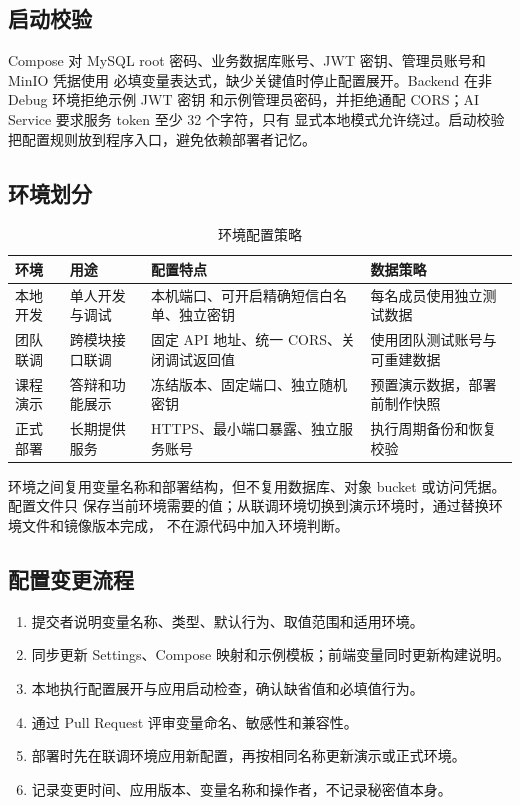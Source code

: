 \subsection{启动校验}

Compose 对 MySQL root 密码、业务数据库账号、JWT 密钥、管理员账号和 MinIO 凭据使用
必填变量表达式，缺少关键值时停止配置展开。Backend 在非 Debug 环境拒绝示例 JWT 密钥
和示例管理员密码，并拒绝通配 CORS；AI Service 要求服务 token 至少 32 个字符，只有
显式本地模式允许绕过。启动校验把配置规则放到程序入口，避免依赖部署者记忆。

\subsection{环境划分}

\begin{table}[H]
  \centering
  \caption{环境配置策略}
  \begin{tabularx}{\textwidth}{L{2.7cm}L{3.5cm}Y Y}
    \toprule
    环境 & 用途 & 配置特点 & 数据策略 \\
    \midrule
    本地开发 & 单人开发与调试 & 本机端口、可开启精确短信白名单、独立密钥 & 每名成员使用独立测试数据 \\
    团队联调 & 跨模块接口联调 & 固定 API 地址、统一 CORS、关闭调试返回值 & 使用团队测试账号与可重建数据 \\
    课程演示 & 答辩和功能展示 & 冻结版本、固定端口、独立随机密钥 & 预置演示数据，部署前制作快照 \\
    正式部署 & 长期提供服务 & HTTPS、最小端口暴露、独立服务账号 & 执行周期备份和恢复校验 \\
    \bottomrule
  \end{tabularx}
\end{table}

环境之间复用变量名称和部署结构，但不复用数据库、对象 bucket 或访问凭据。配置文件只
保存当前环境需要的值；从联调环境切换到演示环境时，通过替换环境文件和镜像版本完成，
不在源代码中加入环境判断。

\subsection{配置变更流程}

\begin{enumerate}
  \item 提交者说明变量名称、类型、默认行为、取值范围和适用环境。
  \item 同步更新 Settings、Compose 映射和示例模板；前端变量同时更新构建说明。
  \item 本地执行配置展开与应用启动检查，确认缺省值和必填值行为。
  \item 通过 Pull Request 评审变量命名、敏感性和兼容性。
  \item 部署时先在联调环境应用新配置，再按相同名称更新演示或正式环境。
  \item 记录变更时间、应用版本、变量名称和操作者，不记录秘密值本身。
\end{enumerate}

